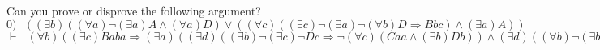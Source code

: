 \documentclass{article}
\begin{document}
Can you prove or disprove the following argument? \newline \newline
 $ 0) ~~~  ((\exists b)((\forall a) \lnot (\exists a)A \land (\forall a)D) \lor ((\forall c)((\exists c) \lnot (\exists a) \lnot (\forall b)D \Rightarrow Bbc) \land (\exists a)A))$ \newline\newline
 $ \vdash ~~~   (\forall b)((\exists c)Baba \Rightarrow (\exists a)((\exists d)((\exists b) \lnot (\exists c) \lnot Dc \Rightarrow  \lnot (\forall c)(Caa \land (\exists b)Db)) \land (\exists d)((\forall b) \lnot (\exists b)Aba \land  \lnot (\exists c)C)))$ \newline\newline
\end{document}
